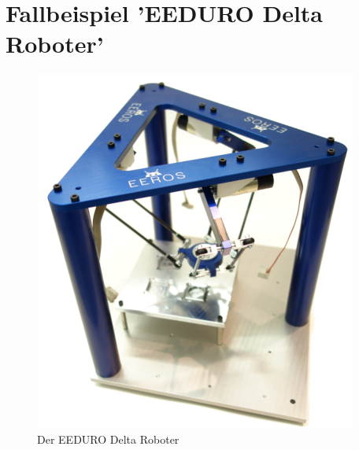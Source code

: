 %
%
%
%



\section{Fallbeispiel 'EEDURO Delta Roboter'}

\begin{figure}[!ht]
\centering
\includegraphics[angle=0]{images/eeduroDelta.png}
\caption{Der EEDURO Delta Roboter}
\label{bildDelta}
\end{figure}



